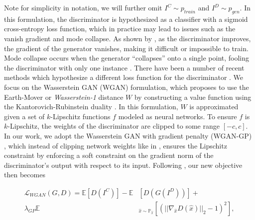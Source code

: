 Note for simplicity in notation, we will further omit $I^C \sim p_{train}$ and $I^D \sim p_{gen}$. In this formulation, 
the discriminator is hypothesized as a classifier with a sigmoid cross-entropy loss function, which in practice may lead
to issues  such as the vanish gradient and mode collapse. As shown by \cite{arjovsky2017towards}, as
the discriminator improves, the gradient of the generator vanishes, making it difficult or impossible to train. Mode
collapse occurs when the generator ``collapses'' onto a single point, fooling the discriminator with only one instance
.
There have been a number of recent methods which hypothesize a different loss function for the discriminator
\cite{mao2016least,arjovsky2017wasserstein,gulrajani2017improved,zhao2016energy}. We focus on the Wasserstein GAN
(WGAN) \cite{arjovsky2017wasserstein} formulation, which proposes to use the Earth-Mover or \textit{Wasserstein-1}
distance $W$ by constructing a value function using the Kantorovich-Rubinstein duality \cite{villani2008optimal}.
In this formulation, $W$ is approximated given a set of $k$-Lipschitz functions $f$ modeled as neural networks. To
ensure $f$ is $k$-Lipschitz, the weights of the discriminator are clipped to some range $[-c, c]$. In our work, we
adopt the Wasserstein GAN with gradient penalty (WGAN-GP) \cite{gulrajani2017improved}, which instead of clipping
network weights like in \cite{arjovsky2017wasserstein}, ensures the Lipschitz constraint by enforcing a soft
constraint on the gradient norm of the discriminator's output with respect to its input. Following
\cite{gulrajani2017improved}, our new objective then becomes

\begin{equation}
\begin{aligned}
   \mathcal{L}_{WGAN}(G,D) = \mathbb{E} [D(I^C)] - \mathbb{E} & [D(G(I^D))] + \\
   \lambda_{GP} \mathbb{E} & _{\hat{x} \sim \mathbb{P}_{\hat{x}}} [(|| \nabla_{\hat{x}} D(\hat{x})||_2 -1)^2 ],
\end{aligned}
\end{equation}


